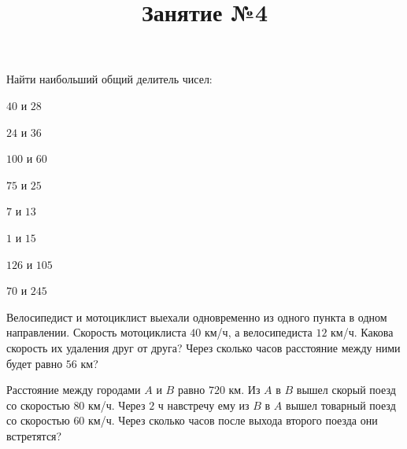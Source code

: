 \begin{listofex}
	\item Найти наибольший общий делитель чисел:
	\begin{enumcols}[itemcolumns=4]
		\item \( 40 \) и \( 28 \)
		\item \( 24 \) и \( 36 \)
		\item \( 100 \) и \( 60 \)
		\item \( 75 \) и \( 25 \)
		\item \( 7 \) и \( 13 \)
		\item \( 1 \) и \( 15 \)
		\item \( 126 \) и \( 105 \)
		\item \( 70 \) и \( 245 \)
	\end{enumcols}
	\item Велосипедист и мотоциклист выехали одновременно из одного пункта в одном направлении. Скорость мотоциклиста \( 40 \) км/ч, а велосипедиста \( 12 \) км/ч. Какова скорость их удаления друг от друга? Через сколько часов расстояние между ними будет равно \( 56 \) км?
	\item Расстояние между городами \( A \) и \( B \) равно \( 720 \) км. Из \( A \) в \( B \) вышел скорый поезд со скоростью \( 80 \) км/ч. Через \( 2 \) ч навстречу ему из \( B \) в \( A \) вышел товарный поезд со скоростью \( 60 \) км/ч. Через сколько часов после выхода второго поезда они встретятся?
\end{listofex}
\newpage
\title{Занятие №4}
